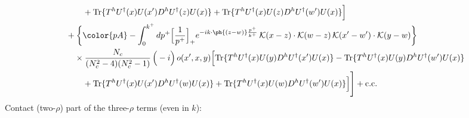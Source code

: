 \begin{align}
&\qquad\quad +{\rm Tr}\{T^{h}U^{\dagger}(x)U(x')D^{h}U^{\dagger}(z)U(x)\}+{\rm Tr}\{T^{h}U^{\dagger}(x)U(z)D^{h}U^{\dagger}(w')U(x)\}\Big]\notag\\
&\quad+\bigg\{{\color{pA}-\int_{0}^{k^{+}}dp^{+}\Big[\frac{1}{p^{+}}\Big]_{+}e^{-ik\cdot\ph{(z-w)}\frac{p^{+}}{k^{+}}}\,\mathcal{K}(x-z)\cdot\mathcal{K}(w-z)\,\mathcal{K}(x'-w')\cdot\mathcal{K}(y-w)}\bigg\}\notag\\
&\qquad\times \frac{N_{c}}{(N_{c}^{2}-4)(N_{c}^{2}-1)}\,\Big(-i\Big)\,o(x',x,y)\Big[{\rm Tr}\{T^{h}U^{\dagger}(x)U(y)D^{h}U^{\dagger}(x')U(x)\}-{\rm Tr}\{T^{h}U^{\dagger}(x)U(y)D^{h}U^{\dagger}(w')U(x)\}\notag\\
&\qquad\quad +{\rm Tr}\{T^{h}U^{\dagger}(x)U(x')D^{h}U^{\dagger}(w)U(x)\}+{\rm Tr}\{T^{h}U^{\dagger}(x)U(w)D^{h}U^{\dagger}(w')U(x)\}\Big]\Bigg]+{\rm c.c.}\label{eq:E-I.III-3}
\end{align}
Contact (two-$\rho$) part of the three-$\rho$ terms (even in $k$):
